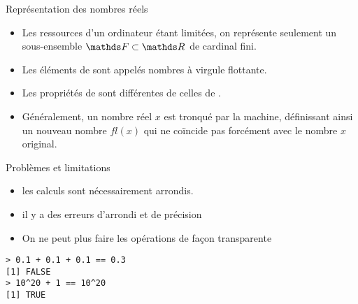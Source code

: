 \begin{frame}[fragile]{Représentation des nombres réels}                                                                                                                
  \begin{itemize}
  \item Les ressources d'un ordinateur étant limitées, on représente seulement un \alert{sous-ensemble $\F \subset \R$ de cardinal fini}.
  \item Les éléments de \F sont appelés \alert{nombres à virgule flottante}.
  \item<alert@1> Les propriétés de \F sont différentes de celles de \R.
  \item Généralement, un nombre réel $x$ est tronqué par la machine, définissant ainsi un nouveau nombre $fl(x)$ qui ne coïncide pas forcément avec le nombre $x$ original. 
  \end{itemize}

  \begin{alertblock}{Problèmes et limitations}
    \begin{itemize}
    \item les calculs sont nécessairement arrondis.
    \item il y a des erreurs d’arrondi et de précision
    \item On ne peut plus faire les opérations de façon transparente
  \end{itemize}
\end{alertblock}

\begin{lstlisting}
> 0.1 + 0.1 + 0.1 == 0.3
[1] FALSE
> 10^20 + 1 == 10^20
[1] TRUE
\end{lstlisting}
\end{frame}



